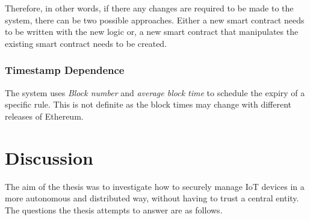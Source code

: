\documentclass[english]{tktltiki}
\begin{document}
Therefore, in other words, if there any changes are required to be made to the system, there can be two possible approaches. Either a new smart contract needs to be written with the new logic or, a new smart contract that manipulates the existing smart contract needs to be created.


\subsubsection{Timestamp Dependence}
The system uses \textit{Block number} and \textit{average block time} to schedule the expiry of a specific rule. This is not definite as the block times may change with different releases of Ethereum.  
\newpage

\section{Discussion}
The aim of the thesis was to investigate how to securely manage IoT devices in a more autonomous and distributed way, without having to trust a central entity. The questions the thesis attempts to answer are as follows.
\end{document}
